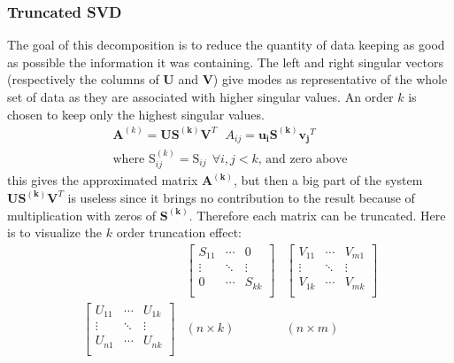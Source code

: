 \documentclass[12pt,a4paper]{article}
\begin{document}
\subsubsection{Truncated SVD}
The goal of this decomposition is to reduce the quantity of data keeping as good as possible the information it was containing. The left and right singular vectors (respectively the columns of $\mathbf{U}$ and $\mathbf{V}$) give modes as representative of the whole set of data as they are associated with higher singular values. An order $k$ is chosen to keep only the highest singular values.
\begin{equation}
\begin{array}{c}
\mathbf{A}^{(k)} = \mathbf{U} \mathbf{S^{(k)}} \mathbf{V}^T
~~~A_{ij} = \mathbf{u_i} \mathbf{S^{(k)}} \mathbf{v_j}^T
\\
\text{where } \text{S}^{(k)}_{ij} = \text{S}_{ij} ~~ \forall i,j < k \text{, and zero above}
\end{array}
\end{equation}
this gives the approximated matrix $\mathbf{A^{(k)}}$, but then a big part of the system $\mathbf{U} \mathbf{S^{(k)}} \mathbf{V}^T$ is useless since it brings no contribution to the result because of multiplication with zeros of $\mathbf{S^{(k)}}$. Therefore each matrix can be truncated. Here is to visualize the $k$ order truncation effect:
\begin{equation}
\begin{matrix}
	&
	\begin{bmatrix}
	   S_{11} &\cdots& 0 \\
	   \vdots &\ddots& \vdots \\
	   0 &\cdots& S_{kk} \\
	\end{bmatrix}
	&
	\begin{bmatrix}
	   V_{11} &\cdots& V_{m1} \\
	   \vdots &\ddots& \vdots \\
	   V_{1k} &\cdots& V_{mk} \\
	\end{bmatrix}
\\
	\begin{bmatrix}
	   U_{11} &\cdots& U_{1k} \\
	   \vdots &\ddots& \vdots \\
	   U_{n1} &\cdots& U_{nk} \\
	\end{bmatrix}
	&
	(n \times k) 
	&
	(n \times m)
\end{matrix}
\end{equation}
\end{document}
